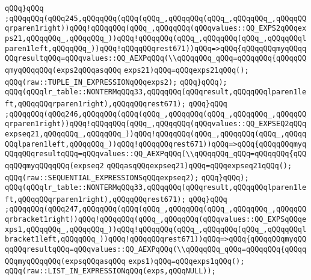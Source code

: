 \verb|qQQq}qQQq|\newline
\verb|;qQQqqQQq(qQQq245,qQQqqQQq(qQQq(qQQq_,qQQqqQQq(qQQq_,qQQqqQQq_,qQQqqQQqrparen1right))qQQq!qQQqqQQq(qQQq_,qQQqqQQq(qQQqvalues::QQ_EXPS2qQQqexps21,qQQqqQQq_,qQQqqQQq_))qQQq!qQQqqQQq(qQQq_,qQQqqQQq(qQQq_,qQQqqQQqlparen1left,qQQqqQQq_))qQQq!qQQqqQQqrest671))qQQq=>qQQq{qQQqqQQqmyqQQqqQQqresultqQQq=qQQqvalues::QQ_AEXPqQQq(\\qQQqqQQq_qQQq=qQQqqQQq{qQQqqQQqmyqQQqqQQq(exps2qQQqasqQQq|\newline
\verb|exps21)qQQq=qQQqexps21qQQq();|\newline
\verb|qQQq(raw::TUPLE_IN_EXPRESSIONqQQqexps2);|\newline
\verb|qQQq}qQQq);|\newline
\verb|qQQq(qQQqlr_table::NONTERMqQQq33,qQQqqQQq(qQQqresult,qQQqqQQqlparen1left,qQQqqQQqrparen1right),qQQqqQQqrest671);|\newline
\verb|qQQq}qQQq|\newline
\verb|;qQQqqQQq(qQQq246,qQQqqQQq(qQQq(qQQq_,qQQqqQQq(qQQq_,qQQqqQQq_,qQQqqQQqrparen1right))qQQq!qQQqqQQq(qQQq_,qQQqqQQq(qQQqvalues::QQ_EXPSEQ2qQQqexpseq21,qQQqqQQq_,qQQqqQQq_))qQQq!qQQqqQQq(qQQq_,qQQqqQQq(qQQq_,qQQqqQQqlparen1left,qQQqqQQq_))qQQq!qQQqqQQqrest671))qQQq=>qQQq{qQQqqQQqmyqQQqqQQqresultqQQq=qQQqvalues::QQ_AEXPqQQq(\\qQQqqQQq_qQQq=qQQqqQQq{qQQqqQQqmyqQQqqQQq(expseq2|\newline
\verb|qQQqasqQQqexpseq21)qQQq=qQQqexpseq21qQQq();|\newline
\verb|qQQq(raw::SEQUENTIAL_EXPRESSIONSqQQqexpseq2);|\newline
\verb|qQQq}qQQq);|\newline
\verb|qQQq(qQQqlr_table::NONTERMqQQq33,qQQqqQQq(qQQqresult,qQQqqQQqlparen1left,qQQqqQQqrparen1right),qQQqqQQqrest671);|\newline
\verb|qQQq}qQQq|\newline
\verb|;qQQqqQQq(qQQq247,qQQqqQQq(qQQq(qQQq_,qQQqqQQq(qQQq_,qQQqqQQq_,qQQqqQQqrbracket1right))qQQq!qQQqqQQq(qQQq_,qQQqqQQq(qQQqvalues::QQ_EXPSqQQqexps1,qQQqqQQq_,qQQqqQQq_))qQQq!qQQqqQQq(qQQq_,qQQqqQQq(qQQq_,qQQqqQQqlbracket1left,qQQqqQQq_))qQQq!qQQqqQQqrest671))qQQq=>qQQq{qQQqqQQqmyqQQqqQQqresultqQQq=qQQqvalues::QQ_AEXPqQQq(\\qQQqqQQq_qQQq=qQQqqQQq{qQQqqQQqmyqQQqqQQq(expsqQQqasqQQq|\newline
\verb|exps1)qQQq=qQQqexps1qQQq();|\newline
\verb|qQQq(raw::LIST_IN_EXPRESSIONqQQq(exps,qQQqNULL));|\newline
